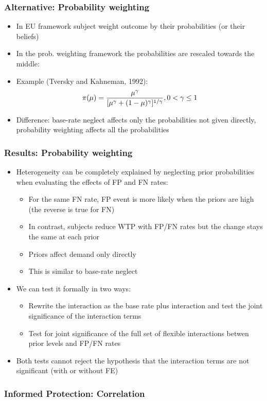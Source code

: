\documentclass[11pt,hyperref={bookmarks=false}]{beamer}
\begin{document}
\begin{frame}
\frametitle{Alternative: Probability weighting}
\begin{itemize}
\item In EU framework subject weight outcome by their probabilities (or their beliefs)
\item In the prob. weighting framework the probabilities are rescaled towards the middle:
\item Example (Tversky and Kahneman, 1992):
$$\pi(\mu)={\mu^{\gamma}\over [\mu^{\gamma}+(1-\mu)^\gamma]^{1/\gamma}}, 0<\gamma\leq 1$$
\item Difference: base-rate neglect affects only the probabilities not given directly, probability weighting affects all the probabilities
\end{itemize}
\end{frame}


\begin{frame}
\frametitle{Results: Probability weighting}
\begin{itemize}
\item Heterogeneity can be completely explained by neglecting prior probabilities when evaluating the effects of FP and FN rates:
\begin{itemize}
\item For the same FN rate, FP event is more likely when the priors are high (the reverse is true for FN)
\item In contrast, subjects reduce WTP with FP/FN rates but the change stays the same at each prior
\item Priors affect demand only directly
\item This is similar to base-rate neglect
\end{itemize}
\item We can test it formally in two ways:
\begin{itemize}
\item Rewrite the interaction as the base rate plus interaction and test the joint significance of the interaction terms
\item Test for joint significance of the full set of flexible interactions betwen prior levels and FP/FN rates
\end{itemize}
\item Both tests cannot reject the hypothesis that the interaction terms are not significant (with or without FE)
\end{itemize}
\end{frame}



\begin{frame}
\frametitle{Informed Protection: Correlation}
\footnotesize

\end{frame}

\fi
\end{document}
